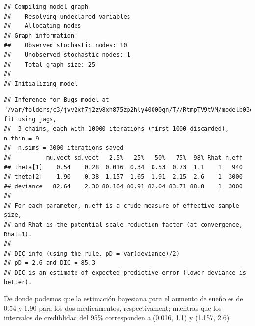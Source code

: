 \begin{Eje}
\begin{knitrout}
\begin{kframe}
\begin{alltt}
 \hlkwb{<-} \hlstd{(} \hlstd{= sleep[,}\hlstd{],} \hlstd{=}\hlstd{(}\hlstd{,}\hlstd{))}

 \hlkwb{<-} \hlstd{(}\hlstd{,}\hlstd{,}\hlstd{,}\hlstd{,}\hlstd{)}
 \hlkwb{<-} \hlstd{(}\hlstd{)}
 \hlkwb{<-} \hlstd{()\{}
\hlstd{(}\hlstd{=}\hlstd{(}\hlstd{,}\hlstd{))}
\hlstd{\}}

 \hlkwb{<-} \hlstd{(} 
                      \hlstd{=}\hlstd{,} \hlstd{=}\hlstd{,} 
\end{alltt}
\begin{verbatim}
## Compiling model graph
##    Resolving undeclared variables
##    Allocating nodes
## Graph information:
##    Observed stochastic nodes: 10
##    Unobserved stochastic nodes: 1
##    Total graph size: 25
## 
## Initializing model
\end{verbatim}
\begin{alltt}
\end{alltt}
\begin{verbatim}
## Inference for Bugs model at "/var/folders/c3/jvv2xf7j2zv8xh875zp2hly40000gn/T//RtmpTV9tVM/modelb03e6ebc0360.txt", fit using jags,
##  3 chains, each with 10000 iterations (first 1000 discarded), n.thin = 9
##  n.sims = 3000 iterations saved
##          mu.vect sd.vect   2.5%   25%   50%   75%  98% Rhat n.eff
## theta[1]    0.54    0.28  0.016  0.34  0.53  0.73  1.1    1   940
## theta[2]    1.90    0.38  1.157  1.65  1.91  2.15  2.6    1  3000
## deviance   82.64    2.30 80.164 80.91 82.04 83.71 88.8    1  3000
## 
## For each parameter, n.eff is a crude measure of effective sample size,
## and Rhat is the potential scale reduction factor (at convergence, Rhat=1).
## 
## DIC info (using the rule, pD = var(deviance)/2)
## pD = 2.6 and DIC = 85.3
## DIC is an estimate of expected predictive error (lower deviance is better).
\end{verbatim}
\end{kframe}
\end{knitrout}
De donde podemos que la estimación bayesiana para el aumento de sueño es de 0.54 y 1.90 para los dos medicamentos, respectivament; mientras que los intervalos de crediblidad del 95\% corresponden a (0.016, 1.1) y (1.157, 2.6).


\end{Eje}
